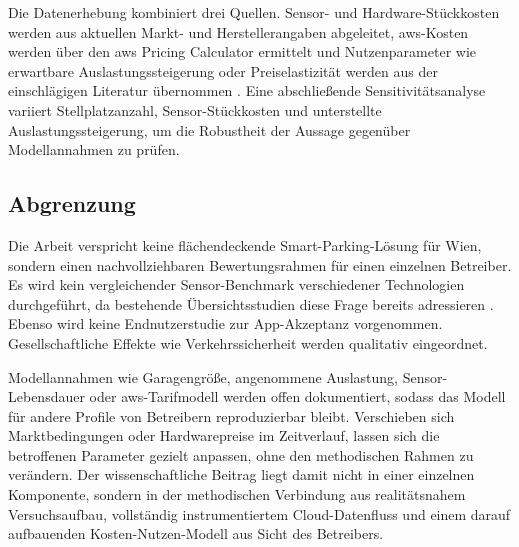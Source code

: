 Die Datenerhebung kombiniert drei Quellen. Sensor- und Hardware-Stückkosten werden aus aktuellen Markt- und Herstellerangaben abgeleitet, \ac{aws}-Kosten werden über den \ac{aws} Pricing Calculator ermittelt und Nutzenparameter wie erwartbare Auslastungssteigerung oder Preiselastizität werden aus der einschlägigen Literatur übernommen \citep{wangEconomicsSmartParking2025,sarkerSmartParkingSystem2020}. Eine abschließende Sensitivitätsanalyse variiert Stellplatzanzahl, Sensor-Stückkosten und unterstellte Auslastungssteigerung, um die Robustheit der Aussage gegenüber Modellannahmen zu prüfen.

\subsection{Abgrenzung}

Die Arbeit verspricht keine flächendeckende Smart-Parking-Lösung für Wien, sondern einen nachvollziehbaren Bewertungsrahmen für einen einzelnen Betreiber. Es wird kein vergleichender Sensor-Benchmark verschiedener Technologien durchgeführt, da bestehende Übersichtsstudien diese Frage bereits adressieren \citep{perkovicSmartParkingSensors2020,fahimSmartParkingSystems2021}. Ebenso wird keine Endnutzerstudie zur App-Akzeptanz vorgenommen. Gesellschaftliche Effekte wie Verkehrssicherheit werden qualitativ eingeordnet.

Modellannahmen wie Garagengröße, angenommene Auslastung, Sensor-Lebensdauer oder \ac{aws}-Tarifmodell werden offen dokumentiert, sodass das Modell für andere Profile von Betreibern reproduzierbar bleibt. Verschieben sich Marktbedingungen oder Hardwarepreise im Zeitverlauf, lassen sich die betroffenen Parameter gezielt anpassen, ohne den methodischen Rahmen zu verändern. Der wissenschaftliche Beitrag liegt damit nicht in einer einzelnen Komponente, sondern in der methodischen Verbindung aus realitätsnahem Versuchsaufbau, vollständig instrumentiertem Cloud-Datenfluss und einem darauf aufbauenden Kosten-Nutzen-Modell aus Sicht des Betreibers.
